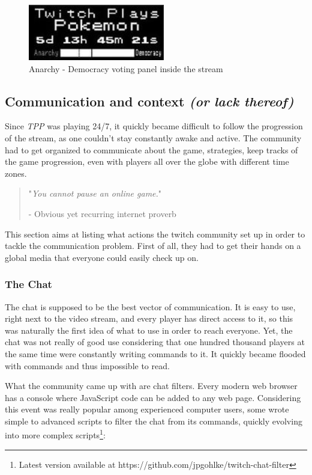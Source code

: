 \documentclass[a4paper]{article}
\begin{document}
\begin{figure}[h]
\includegraphics[center]{pictures/AnarchyVSDemocracy.png}
\caption{Anarchy - Democracy voting panel inside the stream}
\end{figure}

\subsection{Communication and context \textit{(or lack thereof)}}

Since \textit{TPP} was playing 24/7, it quickly became difficult to follow the progression of the stream, as one couldn't stay constantly awake and active. The community had to get organized to communicate about the game, strategies, keep tracks of the game progression, even with players all over the globe with different time zones.

\begin{quote}
{\centering"\textit{You cannot pause an online game.}"\par}
\hfill\hfill- Obvious yet recurring internet proverb
\end{quote}

This section aims at listing what actions the twitch community set up in order to tackle the communication problem. First of all, they had to get their hands on a global media that everyone could easily check up on.

\subsubsection{The Chat}

The chat is supposed to be the best vector of communication. It is easy to use, right next to the video stream, and every player has direct access to it, so this was naturally the first idea of what to use in order to reach everyone. Yet, the chat was not really of good use considering that one hundred thousand players at the same time were constantly writing commands to it. It quickly became flooded with commands and thus impossible to read.

What the community came up with are chat filters. Every modern web browser has a console where JavaScript code can be added to any web page. Considering this event was really popular among experienced computer users, some wrote simple to advanced scripts to filter the chat from its commands, quickly evolving into more complex scripts\footnote{Latest version available at https://github.com/jpgohlke/twitch-chat-filter}:
\end{document}
